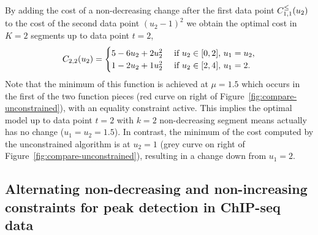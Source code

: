 \documentclass[twoside,11pt]{article}
\begin{document}
By adding the cost of a non-decreasing change after the first data
point $C_{1,1}^\leq(u_2)$ to the cost of the second data point
$(u_2-1)^2$ we obtain the optimal cost in $K=2$ segments up to data
point $t=2$,
\begin{equation}
  C_{2,2}(u_2) = 
  \begin{cases}
    5 - 6 u_2 + 2 u_2^2 &\text{ if }u_2\in[0,2],\,  u_1=u_2,\\
    1 - 2 u_2 + 1 u_2^2 &\text{ if }u_2\in[2,4],\,  u_1=2.
  \end{cases}
\end{equation}
Note that the minimum of this function is achieved at $\mu=1.5$ which
occurs in the first of the two function pieces (red curve on right of
Figure~\ref{fig:compare-unconstrained}), with an equality constraint
active. This implies the optimal model up to data point $t=2$ with
$k=2$ non-decreasing segment means actually has no change
($u_1=u_2=1.5$). In contrast, the minimum of the cost computed by the
unconstrained algorithm is at $u_2=1$ (grey curve on right of
Figure~\ref{fig:compare-unconstrained}), resulting in a change down
from $u_1=2$.

\subsection{Alternating non-decreasing and non-increasing constraints for peak detection in ChIP-seq data}
\label{sec:PeakSeg}
\end{document}
